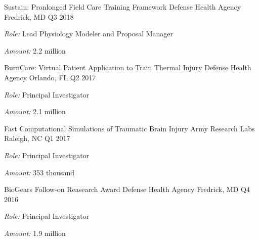 
\begin{cventries}

  \cventry
    {Sustain: Pronlonged Field Care Training Framework} %
    {Defense Health Agency} %
    {Fredrick, MD} %
    {Q3 2018} %
     {
     \begin{cvitems}
     \item{\textit{Role:} Lead Physiology Modeler and Proposal Manager}
     \item{\textit{Amount:} 2.2 million}
     \end{cvitems}
     }

  \cventry
    {BurnCare: Virtual Patient Application to Train Thermal Injury} %
    {Defense Health Agency} %
    {Orlando, FL} %
    {Q2 2017} %
     {
    \begin{cvitems}
     \item{\textit{Role:} Principal Investigator}
     \item{\textit{Amount:} 2.1 million}
    \end{cvitems}
     }

  \cventry
    {Fast Computational Simulations of Traumatic Brain Injury} %
    {Army Research Labs} %
    {Raleigh, NC} %
    {Q1 2017} %
     {
     \begin{cvitems}
     \item{\textit{Role:} Principal Investigator}
     \item{\textit{Amount:} 353 thousand}
     \end{cvitems}
     }

  \cventry
    {BioGears Follow-on Reasearch Award} %
    {Defense Health Agency} %
    {Fredrick, MD} %
    {Q4 2016} %
     {
     \begin{cvitems}
     \item{\textit{Role:} Principal Investigator}
     \item{\textit{Amount:} 1.9 million}
     \end{cvitems}
     }


\end{cventries}
